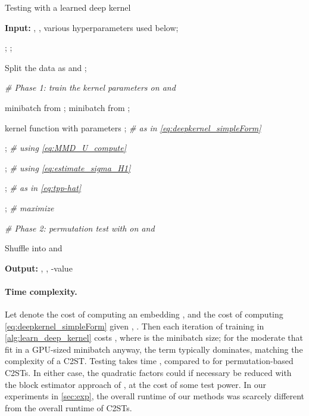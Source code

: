 \documentclass{article}
\begin{document}
\begin{algorithm}[tb]
\footnotesize
\caption{Testing with a learned deep kernel}
\label{alg:learn_deep_kernel}
\begin{algorithmic}
\STATE \textbf{Input:} , , various hyperparameters used below;

\vspace{1mm}
\STATE ; ; 

\STATE Split the data as  and ;

\vspace{1mm}
\STATE \textit{\# Phase 1: train the kernel parameters  on  and \hfill}

\FOR{}

\STATE  minibatch from ;  minibatch from ;

\STATE  kernel function with parameters ;
       \hfill \textit{\# as in \eqref{eq:deepkernel_simpleForm}}

\STATE ;
       \hfill\textit{\# using \eqref{eq:MMD_U_compute}}

\STATE ;
       \hfill\textit{\# using \eqref{eq:estimate_sigma_H1}}

\STATE ;
       \hfill\textit{\# as in \eqref{eq:tpp-hat}}

\STATE ;
       \hfill \textit{\# maximize }

\ENDFOR

\vspace{1mm}
\STATE \textit{\# Phase 2: permutation test with  on  and }
\STATE 

\FOR{}
\STATE Shuffle  into  and 
\STATE 
\ENDFOR

\STATE \textbf{Output:} , , -value 
\end{algorithmic}
\end{algorithm}









\paragraph{Time complexity.}
Let  denote the cost of computing an embedding ,
and  the cost of computing \eqref{eq:deepkernel_simpleForm} given , .
Then each iteration of training in \cref{alg:learn_deep_kernel}
costs , where  is the minibatch size;
for the moderate  that fit in a GPU-sized minibatch anyway,
the  term typically dominates,
matching the complexity of a C2ST.
Testing takes time ,
compared to  for permutation-based C2STs.
In either case, the quadratic factors could if necessary be reduced with the block estimator approach of \citet{Blaschko2013}, at the cost of some test power.
In our experiments in \cref{sec:exp}, the overall runtime of our methods was scarcely different from the overall runtime of C2STs.
\end{document}
